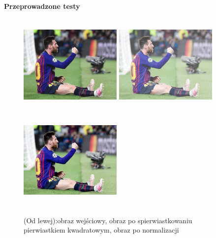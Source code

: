 \documentclass[magisterska,openany]{pracadypl}
\begin{document}
\vspace{0.25cm}\textbf{\Large Przeprowadzone testy}
\vspace{0.5cm}
\begin{figure}[h]
\centering
\includegraphics[width=5cm, height=5cm]{orgi/RGBMessi.jpg}
\includegraphics[width=5cm, height=5cm]{4_9/rootRGB1.jpg}
\includegraphics[width=5cm, height=5cm]{4_9/nrootRGB1.jpg}
\caption{(Od lewej):obraz wejściowy, obraz po spierwiastkowaniu pierwiastkiem kwadratowym, obraz po normalizacji}
\end{figure}
\end{document}
